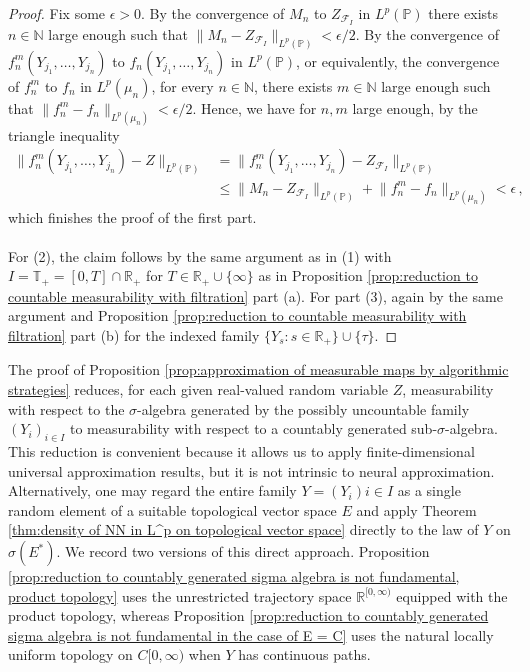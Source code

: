\documentclass[11pt,a4paper,twoside,openany]{report}
\numberwithin{equation}{section}
\theoremstyle{plain} %
\theoremstyle{definition} %
\theoremstyle{remark} %
\begin{document}
\begin{proof}
Fix some \(\epsilon>0\). By the convergence of \(M_n\) to \(Z_{\mathcal{F}_I}\) in \(L^p(\mathbb{P})\) there exists \(n\in\mathbb{N}\) large enough such that \(\lVert M_n-Z_{\mathcal{F}_I}\rVert_{L^p(\mathbb{P})}<\epsilon/2\). By the convergence of \(f_n^m(Y_{j_1},\dots,Y_{j_n})\) to \(f_n(Y_{j_1},\dots,Y_{j_n})\) in \(L^p(\mathbb{P})\), or equivalently, the convergence of \(f_n^m\) to \(f_n\) in \(L^p(\mu_n)\), for every \(n\in\mathbb{N}\), there exists \(m\in\mathbb{N}\) large enough such that \(\lVert f_n^m-f_n\rVert_{L^p(\mu_n)}<\epsilon/2\). Hence, we have for \(n,m\) large enough, by the triangle inequality
\begin{align*}
    \lVert f_n^m(Y_{j_1},\dots,Y_{j_n})-Z\rVert_{L^p(\mathbb{P})}&= 
    \lVert f_n^m(Y_{j_1},\dots,Y_{j_n})-Z_{\mathcal{F}_I}\rVert_{L^p(\mathbb{P})}
    \\&\leq \lVert M_n-Z_{\mathcal{F}_I}\rVert_{L^p(\mathbb{P})}+\lVert f_n^m-f_n\rVert_{L^p(\mu_n)}<\epsilon\,,
\end{align*}
which finishes the proof of the first part. \\\\
For (2), the claim follows by the same argument as in (1) with \(I=\mathbb{T}_+=[0,T]\cap\mathbb{R}_+\) for \(T\in\mathbb{R}_+\cup\{\infty\}\) as in Proposition \ref{prop:reduction to countable measurability with filtration} part (a). For part (3), again by the same argument and Proposition \ref{prop:reduction to countable measurability with filtration} part (b) for the indexed family \(\{Y_s:s\in\mathbb{R}_+\}\cup\{\tau\}\). 
\end{proof}
The proof of Proposition \ref{prop:approximation of measurable maps by algorithmic strategies} reduces, for each given real-valued random variable \(Z\), measurability with respect to the \(\sigma\)-algebra generated by the possibly uncountable family \((Y_i)_{i\in I}\) to measurability with respect to a countably generated sub-\(\sigma\)-algebra. This reduction is convenient because it allows us to apply finite-dimensional universal approximation results, but it is not intrinsic to neural approximation. Alternatively, one may regard the entire family \(Y=(Y_i){i\in I}\) as a single random element of a suitable topological vector space \(E\) and apply Theorem \ref{thm:density of NN in L^p on topological vector space} directly to the law of \(Y\) on \(\sigma(E^*)\). We record two versions of this direct approach. Proposition \ref{prop:reduction to countably generated sigma algebra is not fundamental, product topology} uses the unrestricted trajectory space \(\mathbb R^{[0,\infty)}\) equipped with the product topology, whereas Proposition \ref{prop:reduction to countably generated sigma algebra is not fundamental in the case of E = C} uses the natural locally uniform topology on \(C[0,\infty)\) when \(Y\) has continuous paths.
\end{document}
